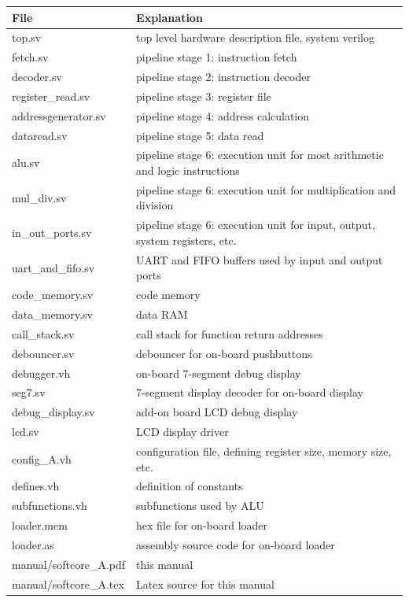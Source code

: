 \documentclass[11pt,a4paper,oneside,openright]{report}
\newcommand{\vv}{ \vspace{2mm} }   %
\begin{document}
\begin{table}[h]
\label{table:FileList}
\begin{tabular}{|l|l|} 
\hline
\bfseries File & \bfseries Explanation  \\ \hline
top.sv & top level hardware description file, system verilog \\ \hline
fetch.sv & pipeline stage 1: instruction fetch \\ \hline
decoder.sv & pipeline stage 2: instruction decoder \\ \hline
register\_read.sv & pipeline stage 3: register file \\ \hline
addressgenerator.sv & pipeline stage 4: address calculation \\ \hline
dataread.sv & pipeline stage 5: data read \\ \hline
alu.sv & pipeline stage 6: execution unit for most arithmetic and logic instructions \\ \hline
mul\_div.sv & pipeline stage 6: execution unit for multiplication and division \\ \hline
in\_out\_ports.sv & pipeline stage 6: execution unit for input, output, system registers, etc. \\ \hline
uart\_and\_fifo.sv & UART and FIFO buffers used by input and output ports \\ \hline
code\_memory.sv & code memory \\ \hline
data\_memory.sv & data RAM \\ \hline
call\_stack.sv & call stack for function return addresses \\ \hline
debouncer.sv & debouncer for on-board pushbuttons \\ \hline
debugger.vh & on-board 7-segment debug display \\ \hline
seg7.sv & 7-segment display decoder for on-board display \\ \hline
debug\_display.sv & add-on board LCD debug display \\ \hline
lcd.sv & LCD display driver \\ \hline
config\_A.vh & configuration file, defining register size, memory size, etc. \\ \hline
defines.vh & definition of constants \\ \hline
subfunctions.vh & subfunctions used by ALU \\ \hline
loader.mem & hex file for on-board loader \\ \hline
loader.as & assembly source code for on-board loader \\ \hline
manual/softcore\_A.pdf & this manual \\ \hline
manual/softcore\_A.tex & Latex source for this manual \\ \hline
\end{tabular}
\end{table}
\vv
\end{document}
